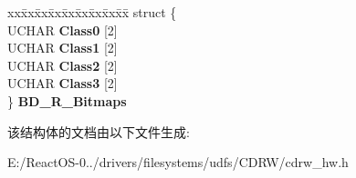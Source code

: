 \begin{DoxyCompactItemize}
\begin{tabbing}
\end{tabbing}\item 
\mbox{\label{struct___b_d___w_r_i_t_e___d_e_s_c_r_i_p_t_o_r_ac59be46d4f3f4881e07c331ad9dac766}} 
\begin{tabbing}
xx\=xx\=xx\=xx\=xx\=xx\=xx\=xx\=xx\=\kill
struct \{\\
\>UCHAR {\bfseries Class0} \mbox{[}2\mbox{]}\\
\>UCHAR {\bfseries Class1} \mbox{[}2\mbox{]}\\
\>UCHAR {\bfseries Class2} \mbox{[}2\mbox{]}\\
\>UCHAR {\bfseries Class3} \mbox{[}2\mbox{]}\\
\} {\bfseries BD\_R\_Bitmaps}\\

\end{tabbing}\end{DoxyCompactItemize}


该结构体的文档由以下文件生成\+:\begin{DoxyCompactItemize}
\item 
E\+:/\+React\+O\+S-\/0../drivers/filesystems/udfs/\+C\+D\+R\+W/cdrw\+\_\+hw.\+h\end{DoxyCompactItemize}
